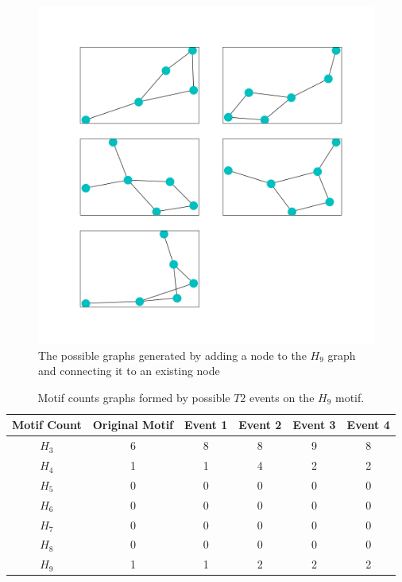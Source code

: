 \begin{figure}[!ht]
    \includegraphics[width=12cm]{Images/H9_evolution.png}
    \centering
    \caption{The possible graphs generated by adding a node to the $H_{9}$ graph 
    and connecting it to an existing node}
\end{figure}

\begin{table}
    \centering
    \begin{tabular}{||c c c c c c ||} 
    \hline
    Motif Count & Original Motif & Event 1 & Event 2 & Event 3  & Event 4\\ [0.5ex] 
    \hline\hline
    $H_{3}$ & 6 & 8 & 8 & 9 & 8\\ 
    \hline
    $H_{4}$ & 1 & 1 & 4 & 2 & 2 \\
    \hline
    $H_{5}$ & 0 & 0 & 0 & 0 & 0\\
    \hline
    $H_{6}$ & 0 & 0 & 0 & 0 & 0\\
    \hline
    $H_{7}$ & 0 & 0 & 0 & 0 & 0\\
    \hline
    $H_{8}$ & 0 & 0 & 0 & 0& 0\\
    \hline
    $H_{9}$ & 1 & 1 & 2 & 2 &2\\
    \hline
   \end{tabular}
   \caption{Motif counts graphs formed by possible $T2$ events on the $H_{9}$ motif.}
   \label{table:7}
\end{table}


